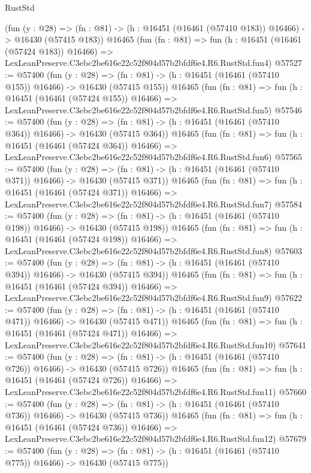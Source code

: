 \begin{lexlean}{RustStd}
\begin{coremodule}
    (fun (y : @28) =>
    (fn : @81) -> (h : @16451 (@16461 (@57410 @183)) @16466) -> @16430 (@57415 @183))
    @16465
    (fun (fn : @81) =>
    fun (h : @16451 (@16461 (@57424 @183)) @16466) =>
    LexLeanPreserve.C3ebc2be616e22c52f804d57b2bfdf6e4.R6.RustStd.fun4)
@57527 := @57400
    (fun (y : @28) =>
    (fn : @81) -> (h : @16451 (@16461 (@57410 @155)) @16466) -> @16430 (@57415 @155))
    @16465
    (fun (fn : @81) =>
    fun (h : @16451 (@16461 (@57424 @155)) @16466) =>
    LexLeanPreserve.C3ebc2be616e22c52f804d57b2bfdf6e4.R6.RustStd.fun5)
@57546 := @57400
    (fun (y : @28) =>
    (fn : @81) -> (h : @16451 (@16461 (@57410 @364)) @16466) -> @16430 (@57415 @364))
    @16465
    (fun (fn : @81) =>
    fun (h : @16451 (@16461 (@57424 @364)) @16466) =>
    LexLeanPreserve.C3ebc2be616e22c52f804d57b2bfdf6e4.R6.RustStd.fun6)
@57565 := @57400
    (fun (y : @28) =>
    (fn : @81) -> (h : @16451 (@16461 (@57410 @371)) @16466) -> @16430 (@57415 @371))
    @16465
    (fun (fn : @81) =>
    fun (h : @16451 (@16461 (@57424 @371)) @16466) =>
    LexLeanPreserve.C3ebc2be616e22c52f804d57b2bfdf6e4.R6.RustStd.fun7)
@57584 := @57400
    (fun (y : @28) =>
    (fn : @81) -> (h : @16451 (@16461 (@57410 @198)) @16466) -> @16430 (@57415 @198))
    @16465
    (fun (fn : @81) =>
    fun (h : @16451 (@16461 (@57424 @198)) @16466) =>
    LexLeanPreserve.C3ebc2be616e22c52f804d57b2bfdf6e4.R6.RustStd.fun8)
@57603 := @57400
    (fun (y : @28) =>
    (fn : @81) -> (h : @16451 (@16461 (@57410 @394)) @16466) -> @16430 (@57415 @394))
    @16465
    (fun (fn : @81) =>
    fun (h : @16451 (@16461 (@57424 @394)) @16466) =>
    LexLeanPreserve.C3ebc2be616e22c52f804d57b2bfdf6e4.R6.RustStd.fun9)
@57622 := @57400
    (fun (y : @28) =>
    (fn : @81) -> (h : @16451 (@16461 (@57410 @471)) @16466) -> @16430 (@57415 @471))
    @16465
    (fun (fn : @81) =>
    fun (h : @16451 (@16461 (@57424 @471)) @16466) =>
    LexLeanPreserve.C3ebc2be616e22c52f804d57b2bfdf6e4.R6.RustStd.fun10)
@57641 := @57400
    (fun (y : @28) =>
    (fn : @81) -> (h : @16451 (@16461 (@57410 @726)) @16466) -> @16430 (@57415 @726))
    @16465
    (fun (fn : @81) =>
    fun (h : @16451 (@16461 (@57424 @726)) @16466) =>
    LexLeanPreserve.C3ebc2be616e22c52f804d57b2bfdf6e4.R6.RustStd.fun11)
@57660 := @57400
    (fun (y : @28) =>
    (fn : @81) -> (h : @16451 (@16461 (@57410 @736)) @16466) -> @16430 (@57415 @736))
    @16465
    (fun (fn : @81) =>
    fun (h : @16451 (@16461 (@57424 @736)) @16466) =>
    LexLeanPreserve.C3ebc2be616e22c52f804d57b2bfdf6e4.R6.RustStd.fun12)
@57679 := @57400
    (fun (y : @28) =>
    (fn : @81) -> (h : @16451 (@16461 (@57410 @775)) @16466) -> @16430 (@57415 @775))

\end{coremodule}
\end{lexlean}
